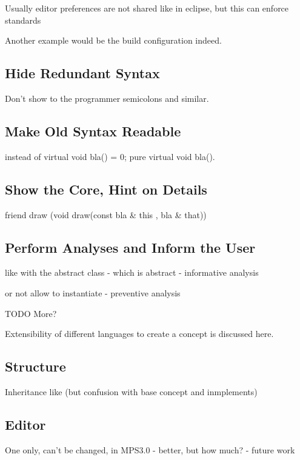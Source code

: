  Usually editor preferences are not shared like in eclipse, but this can enforce standards
 
 Another example would be the build configuration indeed.

\subsection{Hide Redundant Syntax}

Don't show to the programmer semicolons and similar.

\subsection{Make Old Syntax Readable}

instead of virtual void bla() = 0;   pure virtual void bla().

\subsection{Show the Core, Hint on Details}
 friend draw     (void draw(const bla \& this , bla \& that))

\subsection{Perform Analyses and Inform the User}

like with the abstract class - which is abstract - informative analysis


or not allow to instantiate - preventive analysis

TODO More?




Extensibility of different languages to create a concept is discussed here.


\subsection{Structure}
Inheritance like (but confusion with base concept and inmplements)

\subsection{Editor} 
One only, can't be changed, in MPS3.0 - better, but how much? - future work

